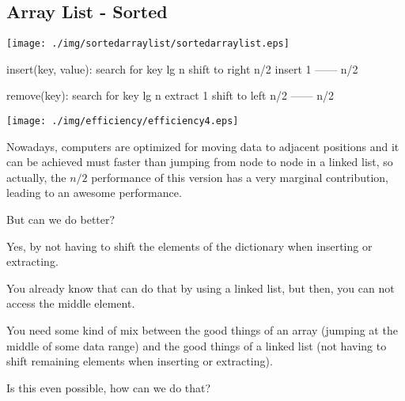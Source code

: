 \documentclass[a4paper, 9pt]{extarticle}
\begin{document}
\newpage

\subsection{Array List - Sorted}

\begin{center}
  \texttt{[image: ./img/sortedarraylist/sortedarraylist.eps]}
\end{center}

\begin{blackboard}
insert(key, value):
  search for key                              lg n
  shift to right                              n/2
  insert                                      1
                                             ------
                                              n/2

remove(key):
  search for key                              lg n
  extract                                     1
  shift to left                               n/2
                                             ------
                                              n/2
\end{blackboard}

\begin{multicols}{2}
\begin{center}
  \texttt{[image: ./img/efficiency/efficiency4.eps]}
\end{center}
\columnbreak

Nowadays, computers are optimized for moving data to adjacent positions and it
can be achieved must faster than jumping from node to node in a linked list, so
actually, the $n/2$ performance of this version has a very marginal
contribution, leading to an awesome performance.

But can we do better?

Yes, by not having to shift the elements of the dictionary when inserting or
extracting.

You already know that can do that by using a linked list, but then, you can not
access the middle element.

You need some kind of mix between the good things of an array (jumping at the
middle of some data range) and the good things of a linked list (not having to
shift remaining elements when inserting or extracting).

Is this even possible, how can we do that?

\end{multicols}
\end{document}
